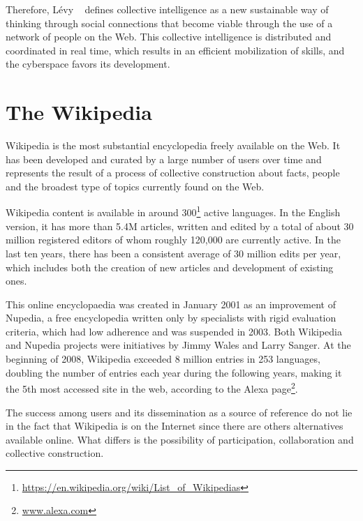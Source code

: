 Therefore, Lévy ~\cite{levy2001cyberculture} defines collective intelligence as a new sustainable way of thinking through social connections that become viable through the use of a network of people on the Web. This collective intelligence is distributed and coordinated in real time, which results in an efficient mobilization of skills, and the cyberspace favors its development.

\section{\hspace*{3pt} The Wikipedia}


Wikipedia is the most substantial encyclopedia freely available on the Web. It has been developed and curated by a large number of users over time and represents the result of a process of collective construction about facts, people and the broadest type of topics currently found on the Web.

Wikipedia content is available in around 300\footnote{\url{https://en.wikipedia.org/wiki/List_of_Wikipedias}} active languages. In the English version, it has more than 5.4M articles,  written and edited by a total of about 30 million registered editors of whom roughly 120,000 are currently active. In the last ten years, there has been a consistent average of 30 million edits per year, which includes both the creation of new articles and development of existing ones. 

This online encyclopaedia was created in January 2001 as an improvement of Nupedia, a free encyclopedia written only by specialists with rigid evaluation criteria, which had low adherence and was suspended in 2003.
Both Wikipedia and Nupedia projects were initiatives by Jimmy Wales and Larry Sanger. At the beginning of 2008, Wikipedia exceeded 8 million entries in 253 languages, doubling the number of entries each year during the following years, making it the 5th most accessed site in the web, according to the Alexa page\footnote{\url{www.alexa.com}}.

The success among users and its dissemination as a source of reference do not lie in the fact that Wikipedia is on the Internet since there are others alternatives available online. What differs is the possibility of participation, collaboration and collective construction. 


